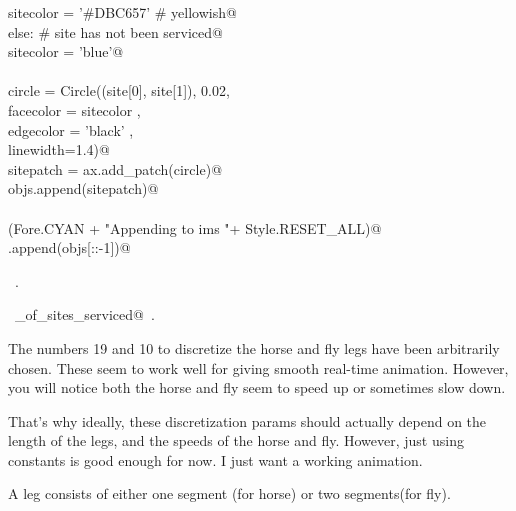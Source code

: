 \documentclass[11.5pt]{report}
\begin{document}
\begin{flushleft}
\begin{list}{}{}
\mbox{}\verb@        sitecolor = '#DBC657' # yellowish@\\
\mbox{}\verb@    else:                                  # site has not been serviced@\\
\mbox{}\verb@        sitecolor = 'blue'@\\
\mbox{}\verb@@\\
\mbox{}\verb@    circle = Circle((site[0], site[1]), 0.02, \@\\
\mbox{}\verb@                    facecolor = sitecolor   , \@\\
\mbox{}\verb@                    edgecolor = 'black'     , \@\\
\mbox{}\verb@                    linewidth=1.4)@\\
\mbox{}\verb@    sitepatch = ax.add_patch(circle)@\\
\mbox{}\verb@    objs.append(sitepatch)@\\
\mbox{}\verb@@\\
\mbox{}\verb@debug(Fore.CYAN + "Appending to ims "+ Style.RESET_ALL)@\\
\mbox{}\verb@ims.append(objs[::-1])@\\
\mbox{}\verb@@{\NWsep}
\end{list}
\vspace{-1.5ex}
\footnotesize
\begin{list}{}{\setlength{\itemsep}{-\parsep}\setlength{\itemindent}{-\leftmargin}}
\item \NWtxtMacroRefIn\ .
\item \NWtxtIdentsUsed\nobreak\  \verb@number_of_sites_serviced@\nobreak\ .
\item{}
\end{list}
\vspace{4ex}
\end{flushleft}
\vspace{-0.8cm} \newchunk \label{subsec-discretize-leg}
The numbers 19 and 10 to discretize the horse and fly legs have been 
arbitrarily chosen. These seem to work well for giving smooth real-time animation. 
However, you will notice  both the horse and fly seem to speed up or sometimes slow 
down. 

That's why ideally, these discretization params should actually depend on the length of the legs, and 
the speeds of the horse and fly. However, just using constants is good enough for now. I just 
want a working animation. 

A leg consists of either one segment (for horse) or two segments(for fly). 
\end{document}
